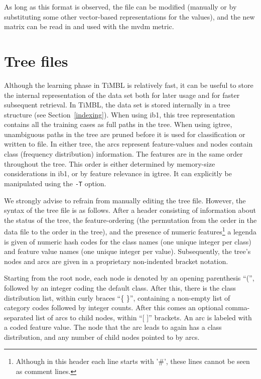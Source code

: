 \documentclass{report}
\begin{document}
As long as this format is observed, the file can be modified (manually
or by substituting some other vector-based representations for the
values), and the new matrix can be read in and used with the {\sc
mvdm} metric.

\section{Tree files}
\label{treeformat}

Although the learning phase in TiMBL is relatively fast, it can be
useful to store the internal representation of the data set both for
later usage and for faster subsequent retrieval. In TiMBL, the data
set is stored internally in a tree structure (see
Section~\ref{indexing}). When using {\sc ib1}, this tree
representation contains all the training cases as full paths in the
tree. When using {\sc igtree}, unambiguous paths in the tree are
pruned before it is used for classification or written to file. In
either tree, the arcs represent feature-values and nodes contain class
(frequency distribution) information. The features are in the same
order throughout the tree. This order is either determined by
memory-size considerations in {\sc ib1}, or by feature relevance in
{\sc igtree}. It can explicitly be manipulated using the {\tt -T}
option.

We strongly advise to refrain from manually editing the tree
file. However, the syntax of the tree file is as
follows. After a header consisting of information about the status of
the tree, the feature-ordering (the permutation from the order in the
data file to the order in the tree), and the presence of numeric
features\footnote{Although in this header each line starts with '\#',
these lines cannot be seen as comment lines.} a legenda is given of
numeric hash codes for the class names (one unique integer per class)
and feature value names (one unique integer per value).  Subsequently,
the tree's nodes and arcs are given in a proprietary non-indented
bracket notation.

Starting from the root node, each node is denoted by an opening
parenthesis ``('', followed by an integer coding the default
class. After this, there is the class distribution list, within curly
braces ``\{ \}'', containing a non-empty list of category codes
followed by integer counts. After this comes an optional
comma-separated list of arcs to child nodes, within ``[ ]''
brackets. An arc is labeled with a coded feature value. The node that
the arc leads to again has a class distribution, and any number of
child nodes pointed to by arcs.
\end{document}
